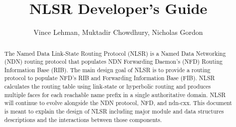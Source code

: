 \documentclass[10pt]{article}
\title{NLSR Developer's Guide}
\author[1]{Vince Lehman, Muktadir Chowdhury, Nicholas Gordon}
\affil[1]{University of Memphis}
\begin{document}
\maketitle

\begin{abstract}
The Named Data Link-State Routing Protocol (NLSR) is a Named Data Networking (NDN) routing protocol that populates NDN Forwarding Daemon's (NFD) Routing Information Base (RIB).
The main design goal of NLSR is to provide a routing protocol to populate NFD's RIB and Forwarding Information Base (FIB).
NLSR calculates the routing table using link-state or hyperbolic routing and produces multiple faces for each reachable name prefix in a single authoritative domain.
NLSR will continue to evolve alongside the NDN protocol, NFD, and ndn-cxx.
This document is meant to explain the design of NLSR including major module and data structures descriptions and the interactions between those components.

\end{abstract}

\tableofcontents
\clearpage


\clearpage

\clearpage

\clearpage

\clearpage

\clearpage

\clearpage

\clearpage

\clearpage
%
%
%

\clearpage

\clearpage

{}



\end{document}
